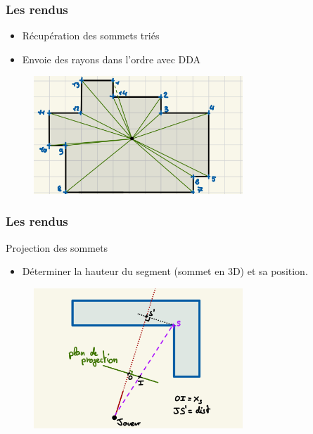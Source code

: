 \documentclass{beamer}
\begin{document}
\begin{frame}
    \frametitle{Les rendus}
    \begin{block}{}
        \begin{itemize}
            \item Récupération des sommets triés
            \item Envoie des rayons dans l'ordre avec DDA
        \end{itemize}
    \end{block}
    \begin{figure}
        \centering
        \includegraphics[width=0.7\textwidth]{images/envoie-rayon-ordre.jpeg}
    \end{figure}
\end{frame}

\begin{frame}
    \frametitle{Les rendus}
    \begin{block}{Projection des sommets}
        \begin{itemize}
            \item Déterminer la hauteur du segment (sommet en 3D) et sa position.
        \end{itemize}
    \end{block}
    \begin{figure}
        \centering
        \includegraphics[width=0.7\textwidth]{images/shemaLanceRayon01.jpeg}
    \end{figure}
\end{frame}
\end{document}
